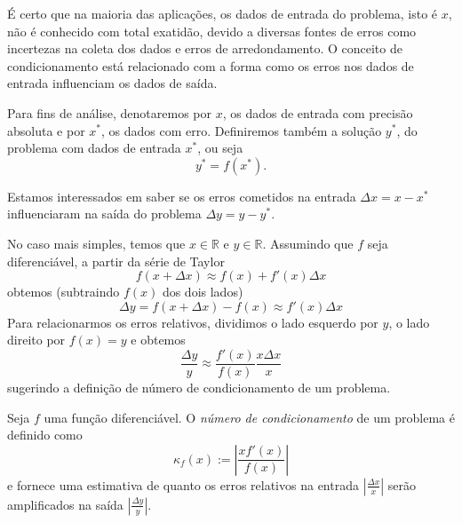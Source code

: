 É certo que na maioria das aplicações, os dados de entrada do problema, isto é $x$, não é conhecido com total exatidão, devido a diversas fontes de erros como incertezas na coleta dos dados e erros de arredondamento. O conceito de condicionamento está relacionado com a forma como os erros nos dados de entrada influenciam os dados de saída.

Para fins de análise, denotaremos por $x$, os dados de entrada com precisão absoluta e por $x^*$, os dados com erro. Definiremos também a solução $y^*$, do problema com dados de entrada $x^*$, ou seja
\begin{equation*}
   y^*=f(x^*).
\end{equation*}

Estamos interessados em saber se os erros cometidos na entrada $\Delta x=x-x^* $ influenciaram na saída do problema $\Delta y=y-y^*$.

No caso mais simples, temos que $x \in \mathbb{R}$ e $y \in \mathbb{R}$. Assumindo que $f$ seja diferenciável, a partir da série de Taylor
\begin{equation*}
 f(x+\Delta x) \approx f(x) + f'(x) \Delta x
\end{equation*}
obtemos (subtraindo $f(x)$ dos dois lados)
\begin{equation*}
 \Delta y = f(x+\Delta x)-f(x) \approx f'(x) \Delta x
\end{equation*}
Para relacionarmos os erros relativos, dividimos o lado esquerdo por $y$, o lado direito por $f(x)=y$ e obtemos
\begin{equation*}
 \frac{ \Delta y}{y} \approx \frac{f'(x)}{f(x)}  \frac{x \Delta x}{x} 
\end{equation*}
sugerindo a definição de número de condicionamento de um problema.

\begin{defn}
Seja $f$ uma função diferenciável. O \emph{número de condicionamento} de um problema é definido como
\begin{equation*}
  \kappa_f(x) := \left| \frac{ x f'(x)}{f(x)} \right|
\end{equation*}
e fornece uma estimativa de quanto os erros relativos na entrada $\left|\frac{\Delta x}{x}\right|$ serão amplificados na saída $\left|\frac{\Delta y}{y}\right|$.
\end{defn}


